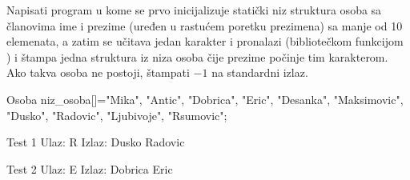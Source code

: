 \begin{Exercise}[label=411]
  Napisati program u kome se prvo inicijalizuje statički niz struktura
  osoba sa članovima ime i prezime (uređen u rastućem poretku
  prezimena) sa manje od 10 elemenata, a zatim se učitava jedan
  karakter i pronalazi (bibliotečkom funkcijom ) i
  štampa jedna struktura iz niza osoba čije prezime počinje tim
  karakterom. Ako takva osoba ne postoji, štampati $-1$ na standardni
  izlaz.
\begin{ckod}
Osoba niz_osoba[]={{"Mika", "Antic"},
                   {"Dobrica", "Eric"},
                   {"Desanka", "Maksimovic"},
                   {"Dusko", "Radovic"},
                   {"Ljubivoje", "Rsumovic"}};
\end{ckod}
  
\begin{minitest}
\begin{test}{Test 1}
Ulaz:  R
Izlaz: Dusko Radovic
\end{test}
\end{minitest}
\begin{minitest}
\begin{test}{Test 2}
Ulaz:  E
Izlaz: Dobrica Eric
\end{test}
\end{minitest}


\end{Exercise}





